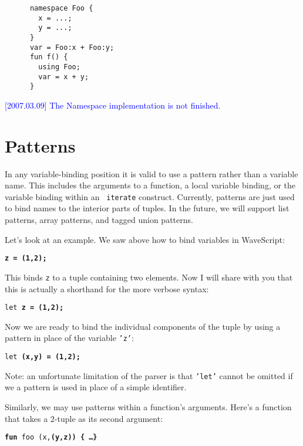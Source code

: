 \documentclass[twocolumn]{report}
\newcommand{\rednote}[1]{{\textcolor{blue}{#1}}}
\begin{document}
\begin{center}
\begin{verbatim}
      namespace Foo {
        x = ...;
        y = ...;
      }
      var = Foo:x + Foo:y;
      fun f() {
        using Foo;
        var = x + y;
      }
\end{verbatim}
\end{center}

\rednote{[2007.03.09] The Namespace implementation is not finished.}




\section{Patterns}
\label{s:patterns}

In any variable-binding position it is valid to use a pattern rather
than a variable name.  This includes the arguments to a function, a
local variable binding, or the variable binding within an {\tt
 iterate} construct.  Currently, patterns are just used to bind names
to the interior parts of tuples.  In the future, we will support list
patterns, array patterns, and tagged union patterns.  

Let's look at an example.
We saw above how to bind variables in WaveScript:
\begin{center}
{\tt \bf{z} = (1,2);}
\end{center}
This binds {\tt z} to a tuple containing two elements.  
Now I will share with you that this is actually a shorthand for the
more verbose syntax:
\begin{center}
{\tt let \bf{z} = (1,2);}
\end{center}
Now we are ready to bind the individual components of the tuple by using
a pattern in place of the variable {\tt 'z'}:
\begin{center}
{\tt let \bf{(x,y)} = (1,2);}
\end{center}
Note: an unfortunate limitation of the parser is that {\tt 'let'} cannot be
omitted if we a pattern is used in place of a simple identifier.

Similarly, we may use patterns within a function's arguments.  Here's
a function that takes a 2-tuple as its second argument:

\begin{center}
{\tt {\bf fun} foo (x,\bf{(y,z)}) \{ \dots \}}
\end{center}
\end{document}
